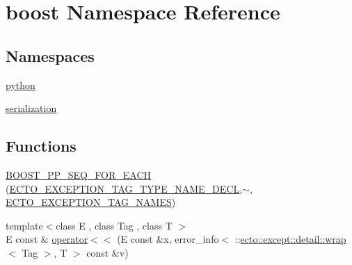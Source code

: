 \hypertarget{namespaceboost}{\section{boost Namespace Reference}
\label{namespaceboost}
}
\subsection*{Namespaces}
\begin{DoxyCompactItemize}
\item 
\hyperlink{namespaceboost_1_1python}{python}
\item 
\hyperlink{namespaceboost_1_1serialization}{serialization}
\end{DoxyCompactItemize}
\subsection*{Functions}
\begin{DoxyCompactItemize}
\item 
\hyperlink{namespaceboost_ac098a4e20f2e80e827e2022ad264473a}{B\-O\-O\-S\-T\-\_\-\-P\-P\-\_\-\-S\-E\-Q\-\_\-\-F\-O\-R\-\_\-\-E\-A\-C\-H} (\hyperlink{except_8hpp_a61f61285d4749b701b559d10678908a4}{E\-C\-T\-O\-\_\-\-E\-X\-C\-E\-P\-T\-I\-O\-N\-\_\-\-T\-A\-G\-\_\-\-T\-Y\-P\-E\-\_\-\-N\-A\-M\-E\-\_\-\-D\-E\-C\-L},$\sim$, \hyperlink{except_8hpp_a6a632b3827deba566cbca48b37bf53e2}{E\-C\-T\-O\-\_\-\-E\-X\-C\-E\-P\-T\-I\-O\-N\-\_\-\-T\-A\-G\-\_\-\-N\-A\-M\-E\-S})
\item 
{\footnotesize template$<$class E , class Tag , class T $>$ }\\E const \& \hyperlink{namespaceboost_a50253cbebddb80700be930287ab2fcde}{operator$<$$<$} (E const \&x, error\-\_\-info$<$ \-::\hyperlink{structecto_1_1except_1_1detail_1_1wrap}{ecto\-::except\-::detail\-::wrap}$<$ Tag $>$, T $>$ const \&v)
\end{DoxyCompactItemize}


